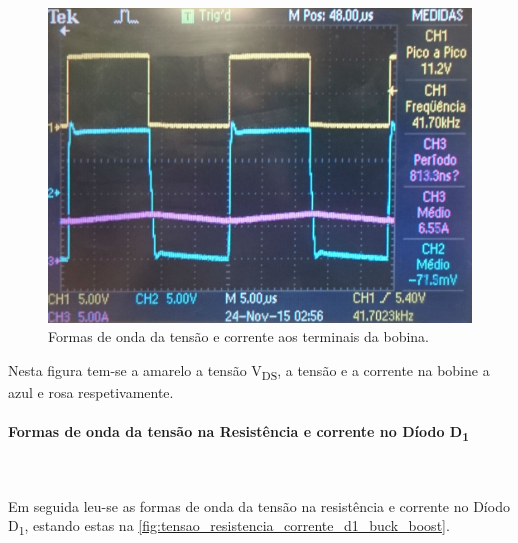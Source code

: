 \documentclass[a4paper,11pt]{article}
\numberwithin{equation}{section}
\begin{document}
\begin{figure}[H]
	\centering
	\includegraphics[keepaspectratio=true, scale=0.14]{img/figs/tensao_corrente_bobina_buck_boost}
	\caption{Formas de onda da tensão e corrente aos terminais da bobina.}
	\label{fig:tensao_corrente_bobina_buck_boost}
	\vspace{-0.8em}
\end{figure}

Nesta figura tem-se a amarelo a tensão V\textsubscript{DS}, a tensão e a corrente na bobine a azul e rosa respetivamente.

\paragraph{Formas de onda da tensão na Resistência e corrente no Díodo D\textsubscript{1}}\mbox{}\

Em seguida leu-se as formas de onda da tensão na resistência e corrente no Díodo D\textsubscript{1}, estando estas na \autoref{fig:tensao_resistencia_corrente_d1_buck_boost}.
\end{document}

